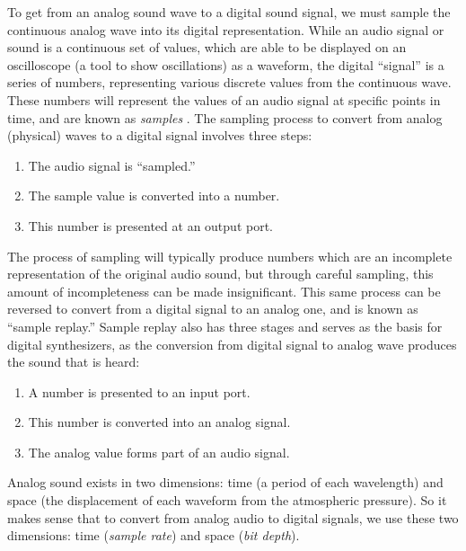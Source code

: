 To get from an analog sound wave to a digital sound signal, we must sample the continuous analog wave into its digital representation. While an audio signal or sound is a continuous set of values, which are able to be displayed on an oscilloscope (a tool to show oscillations) as a waveform, the digital ``signal'' is a series of numbers, representing various discrete values from the continuous wave. These numbers will represent the values of an audio signal at specific points in time, and are known as \textit{samples} \cite{Russ_2012}. The sampling process to convert from analog (physical) waves to a digital signal involves three steps:

\begin{enumerate}
	\item The audio signal is ``sampled.''
	\item The sample value is converted into a number.
	\item This number is presented at an output port.
\end{enumerate}

The process of sampling will typically produce numbers which are an incomplete representation of the original audio sound, but through careful sampling, this amount of incompleteness can be made insignificant. This same process can be reversed to convert from a digital signal to an analog one, and is known as ``sample replay.'' Sample replay also has three stages and serves as the basis for digital synthesizers, as the conversion from digital signal to analog wave produces the sound that is heard:

\begin{enumerate}
	\item A number is presented to an input port.
	\item This number is converted into an analog signal.
	\item The analog value forms part of an audio signal.
\end{enumerate}

Analog sound exists in two dimensions: time (a period of each wavelength) and space (the displacement of each waveform from the atmospheric pressure). So it makes sense that to convert from analog audio to digital signals, we use these two dimensions: time (\textit{sample rate}) and space (\textit{bit depth}). 

